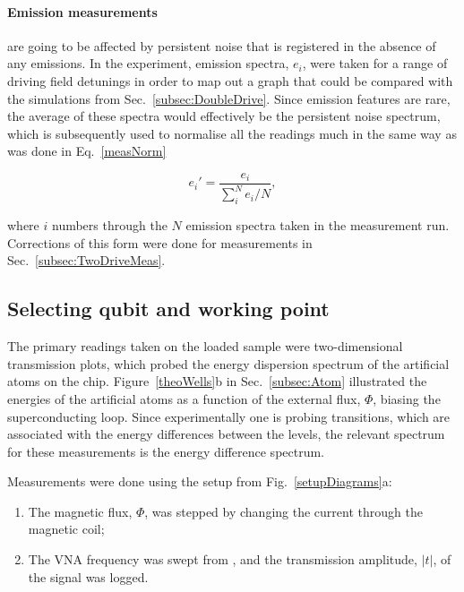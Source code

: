  \paragraph{Emission measurements} are going to be affected by persistent noise that is registered in the absence of any emissions. In the experiment, emission spectra, $ e_i$, were taken for a range of driving field detunings in order to map out a graph that could be compared with the simulations from Sec.~\ref{subsec:DoubleDrive}. Since emission features are rare, the average of these spectra would effectively be the persistent noise spectrum, which is subsequently used to normalise all the readings much in the same way as was done in Eq.~\eqref{measNorm}
  
  \begin{equation}
	  e_i' = \frac{e_i}{\sum_{i}^{N}e_i/N},
  \end{equation} 
  
  \noindent where $ i $ numbers through the $ N $ emission spectra taken in the measurement run. Corrections of this form were done for measurements in Sec.~\ref{subsec:TwoDriveMeas}.
  
 \subsection{Selecting qubit and working point\label{subsec:WorkingPOint}}
  The primary readings taken on the loaded sample were two-dimensional transmission plots, which probed the energy dispersion spectrum of the artificial atoms on the chip. Figure~\ref{theoWells}b in Sec.~\ref{subsec:Atom} illustrated the energies of the artificial atoms as a function of the external flux, $ \Phi $, biasing the superconducting loop. Since experimentally one is probing transitions, which are associated with the energy differences between the levels, the relevant spectrum for these measurements is the energy difference spectrum.
  
  Measurements were done using the setup from Fig.~\ref{setupDiagrams}a:
  
  \begin{enumerate}
  	\item The magnetic flux, $ \Phi $, was stepped by changing the current through the magnetic coil;
  	\item The VNA frequency was swept from , and the transmission amplitude, $ |t| $, of the signal was logged.
  \end{enumerate}


